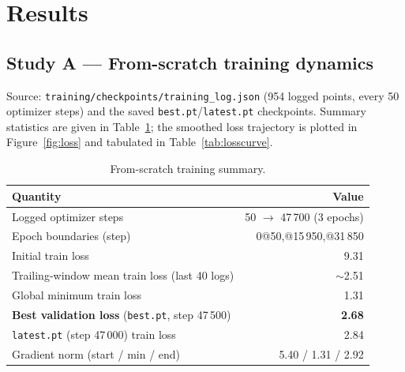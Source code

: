 \documentclass[11pt,a4paper]{article}
\begin{document}
\section{Results}

\subsection{Study A — From-scratch training dynamics}
Source: \texttt{training/checkpoints/training\_log.json} (954 logged points,
every 50 optimizer steps) and the saved \texttt{best.pt}/\texttt{latest.pt}
checkpoints. Summary statistics are given in Table~\ref{tab:trainstats}; the
smoothed loss trajectory is plotted in Figure~\ref{fig:loss} and tabulated in
Table~\ref{tab:losscurve}.

\begin{table}[h]
\centering
\caption{From-scratch training summary.}
\label{tab:trainstats}
\small
\begin{tabular}{@{}lr@{}}
\toprule
\textbf{Quantity} & \textbf{Value} \\
\midrule
Logged optimizer steps                 & 50 $\to$ 47\,700 (3 epochs) \\
Epoch boundaries (step)                & 0@50,\; 1@15\,950,\; 2@31\,850 \\
Initial train loss                     & 9.31 \\
Trailing-window mean train loss (last 40 logs) & $\sim$2.51 \\
Global minimum train loss              & 1.31 \\
\textbf{Best validation loss} (\texttt{best.pt}, step 47\,500) & \textbf{2.68} \\
\texttt{latest.pt} (step 47\,000) train loss & 2.84 \\
Gradient norm (start / min / end)      & 5.40 / 1.31 / 2.92 \\
\bottomrule
\end{tabular}
\end{table}
\end{document}
